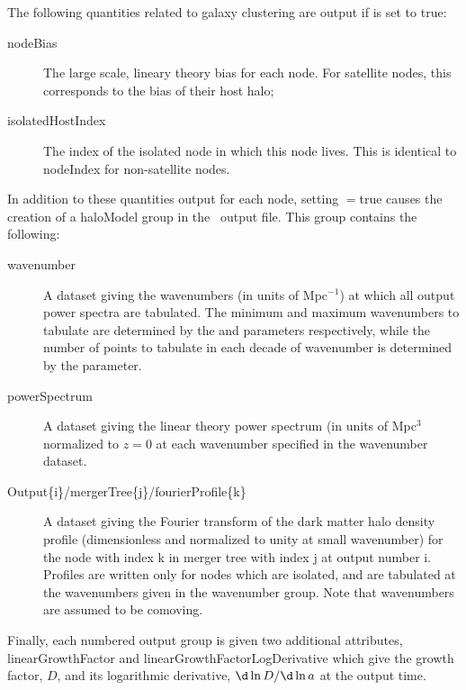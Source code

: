 The following quantities related to galaxy clustering are output if {\normalfont \ttfamily [outputHaloModelData]} is set to true:
\begin{description}
 \item [{\normalfont \ttfamily nodeBias}] The large scale, lineary theory bias for each node. For satellite nodes, this corresponds to the bias of their host halo;
 \item [{\normalfont \ttfamily isolatedHostIndex}] The index of the isolated node in which this node lives. This is identical to {\normalfont \ttfamily nodeIndex} for non-satellite nodes.
\end{description}
In addition to these quantities output for each node, setting {\normalfont \ttfamily [outputHaloModelData]}$=${\normalfont \ttfamily true} causes the creation of a {\normalfont \ttfamily haloModel} group in the \glc\ output file. This group contains the following:
\begin{description}
 \item [{\normalfont \ttfamily wavenumber}] A dataset giving the wavenumbers (in units of Mpc$^{-1}$) at which all output power spectra are tabulated. The minimum and maximum wavenumbers to tabulate are determined by the {\normalfont \ttfamily [haloModelWavenumberMinimum]} and {\normalfont \ttfamily [haloModelWavenumberMaximum]} parameters respectively, while the number of points to tabulate in each decade of wavenumber is determined by the {\normalfont \ttfamily [haloModelWavenumberPointsPerDecade]} parameter.
 \item [{\normalfont \ttfamily powerSpectrum}] A dataset giving the linear theory power spectrum (in units of Mpc$^3$ normalized to $z=0$ at each wavenumber specified in the {\normalfont \ttfamily wavenumber} dataset.
 \item [{\normalfont \ttfamily Output\{i\}/mergerTree\{j\}/fourierProfile\{k\}}] A dataset giving the Fourier transform of the dark matter halo density profile (dimensionless and normalized to unity at small wavenumber) for the node with index {\normalfont \ttfamily k} in merger tree with index {\normalfont \ttfamily j} at output number {\normalfont \ttfamily i}. Profiles are written only for nodes which are isolated, and are tabulated at the wavenumbers given in the {\normalfont \ttfamily wavenumber} group. Note that wavenumbers are assumed to be comoving.
\end{description}
Finally, each numbered output group is given two additional attributes, {\normalfont \ttfamily linearGrowthFactor} and {\normalfont \ttfamily linearGrowthFactorLogDerivative} which give the growth factor, $D$, and its logarithmic derivative, $\d \ln D / \d \ln a$ at the output time.

